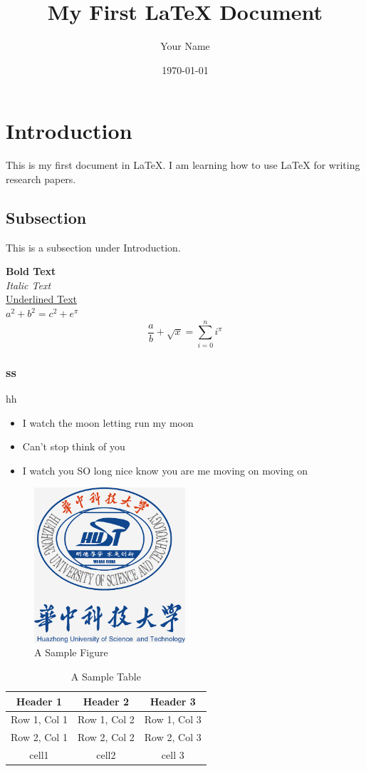\documentclass{article} %
\title{My First LaTeX Document} %
\author{Your Name} %
\date{\today} %
\begin{document}

\maketitle
\tableofcontents
\section{Introduction} %
This is my first document in LaTeX. I am learning how to use LaTeX for writing research papers.

\subsection{Subsection} %
This is a subsection under Introduction.

\textbf{Bold Text}\\ %
\textit{Italic Text}\\ %
\underline{Underlined Text}\\ %
$ a^2+b^2 = c^2+e^\pi $\\
\[
\frac{a}{b} + \sqrt{x} = \sum_{i=0}^n i^\pi 
\]
\subsubsection{ss}
hh\\
\begin{itemize}
    \item I watch the moon letting run my moon
    \item Can't stop think of you
    \item I watch you SO long nice know you are me moving on  moving on
\end{itemize}
\begin{figure}[h]
  \centering
  \includegraphics[width=0.5\textwidth]{logo.png}
  \caption{A Sample Figure}
  \label{fig:sample}
\end{figure}

\begin{table}[h]
\centering
\begin{tabular}{|c|c|c|}
\hline
Header 1 & Header 2 & Header 3 \\
\hline
Row 1, Col 1 & Row 1, Col 2 & Row 1, Col 3 \\
Row 2, Col 1 & Row 2, Col 2 & Row 2, Col 3 \\
cell1  & cell2 & cell 3 \\
\hline
\end{tabular}
\caption{A Sample Table}
\end{table}
\end{document}

